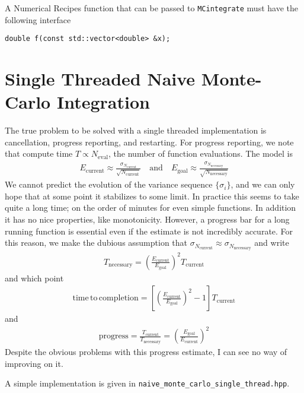 \documentclass[landscape]{article}
\numberwithin{equation}{section}
\begin{document}
A Numerical Recipes function that can be passed to \texttt{MCintegrate} must have the following interface
\begin{verbatim}
double f(const std::vector<double> &x);
\end{verbatim}


\section{Single Threaded Naive Monte-Carlo Integration}


The true problem to be solved with a single threaded implementation is cancellation, progress reporting, and restarting.
For progress reporting, we note that compute time $T \propto N_{\mathrm{eval}}$, the number of function evaluations.
The model is
\begin{align*}
E_{\mathrm{current}} \approx \frac{\sigma_{N_{\mathrm{current}}}}{\sqrt{N_{\mathrm{current}}}}
\quad \mathrm{and} \quad
E_{\mathrm{goal}} \approx \frac{\sigma_{N_{\mathrm{necessary}}}}{\sqrt{N_{\mathrm{necessary}}}}
\end{align*}
We cannot predict the evolution of the variance sequence $\{\sigma_{i}\}$, and we can only hope that at some point it stabilizes to some limit.
In practice this seems to take quite a long time; on the order of minutes for even simple functions.
In addition it has no nice properties, like monotonicity.
However, a progress bar for a long running function is essential even if the estimate is not incredibly accurate.
For this reason, we make the dubious assumption that $\sigma_{N_{\mathrm{current}}} \approx \sigma_{N_{\mathrm{necessary}}}$ and write
\begin{align*}
T_{\mathrm{necessary}} = \left( \frac{E_{\mathrm{current}}}{E_{\mathrm{goal}}} \right)^{2}T_{\mathrm{current}}
\end{align*}
and which point
\begin{align*}
\mathrm{time\, to\, completion } = \left[\left( \frac{E_{\mathrm{current}}}{E_{\mathrm{goal}}} \right)^{2} -1 \right]T_{\mathrm{current}}
\end{align*}
and
\begin{align*}
\mathrm{progress} = \frac{T_{\mathrm{current}}}{T_{\mathrm{necessary}}} = \left( \frac{E_{\mathrm{goal}}}{E_{\mathrm{current}}} \right)^{2}
\end{align*}
Despite the obvious problems with this progress estimate, I can see no way of improving on it.

A simple implementation is given in \texttt{naive\_monte\_carlo\_single\_thread.hpp}.
\end{document}
